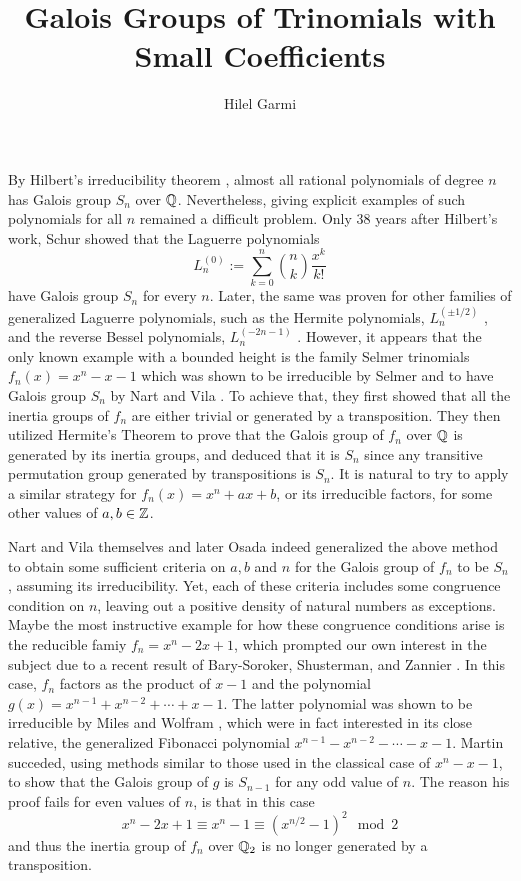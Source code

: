 \documentclass[../main.tex]{subfiles}
\begin{document}
\title{
  Galois Groups of Trinomials with Small Coefficients
}
\author{Hilel Garmi}
\maketitle
By Hilbert's irreducibility theorem \cite{Hilbert}, almost all rational polynomials of degree $n$ has Galois group $S_n$ over $\mathbb{Q}$.
Nevertheless, giving explicit examples of such polynomials for all $n$ remained a difficult problem.
Only 38 years after Hilbert's work, Schur \cite{schur1931affectless} showed that the Laguerre polynomials 
\[
  L_n^{\left( 0 \right)} := \sum_{k=0}^n \binom{n}{k} \frac{x^k}{k!}
\]
have Galois group $S_n$ for every $n$.
Later, the same was proven for other families of generalized Laguerre polynomials, such as the Hermite polynomials, $L^{\left( \pm 1/2 \right)}_n$ \cite{schur1931affectless}, and the reverse Bessel polynomials, $L^{\left( -2n-1 \right)}_n$ \cite{grosswald1978bessel} \cite{filaseta2002irreducibility}.
However, it appears that the only known example with a bounded height is the family Selmer trinomials $f_n\left( x \right) = x^n - x - 1$  which was shown to be irreducible by Selmer \cite{SelmerIrreducibility1956} and to have Galois group $S_n$ by Nart and Vila \cite{NartVila1979}.
To achieve that, they first showed that all the inertia groups of $f_n$ are either trivial or generated by a transposition.
They then utilized Hermite's Theorem to prove that the Galois group of $f_n$ over $\mathbb{Q}$ is generated by its inertia groups, and deduced that it is $S_n$ since any transitive permutation group generated by transpositions is $S_n$.
It is natural to try to apply a similar strategy for $f_n\left( x \right) = x^n + ax + b$, or its irreducible factors, for some other values of $a,b \in \mathbb{Z}$.

Nart and Vila \cite{NartVila1979} themselves and later Osada \cite{Osada1987TheGG} indeed generalized the above method to obtain some sufficient criteria on $a,b$ and $n$ for the Galois group of $f_n$ to be $S_n$, assuming its irreducibility.
Yet, each of these criteria includes some congruence condition on $n$, leaving out a positive density of natural numbers as exceptions.
Maybe the most instructive example for how these congruence conditions arise is the  reducible famiy $f_n = x^n - 2x + 1$, which prompted our own interest in the subject due to a recent result of Bary-Soroker, Shusterman, and Zannier \cite[Appendix A]{Soroker_appendix_2017}.
In this case, $f_n$ factors as the product of $x-1$ and the polynomial $g\left( x \right) = x^{n-1} + x^{n-2} + \cdots + x - 1$.
The latter polynomial was shown to be irreducible by Miles \cite{Miles1960} and Wolfram \cite{Wolfram1998}, which were in fact interested in its close relative, the generalized Fibonacci polynomial $x^{n-1} - x^{n-2} - \cdots - x - 1$.
Martin \cite{MARTIN2004213} succeded, using methods similar to those used in the classical case of $x^n - x - 1$, to show that the Galois group of $g$ is $S_{n-1}$ for any odd value of $n$.
The reason his proof fails for even values of $n$, is that in this case 
\[
  x^n - 2x + 1 \equiv x^n - 1 \equiv \left( x^{n/2} - 1\right)^2 \mod 2
\]
and thus the inertia group of $f_n$ over $\mathbb{Q}_2$ is no longer generated by a transposition.
\end{document}
